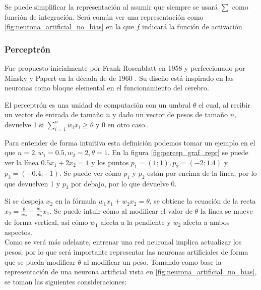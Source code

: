 Se puede simplificar la representación al asumir que siempre se usará $ \sum $ como función de integración. Será común ver una representación como \ref{fig:neurona_artificial_no_bias} en la que $ f $ indicará la función de activación.


\subsubsection{Perceptrón}\label{subsubsec:perceptron}

Fue propuesto inicialmente por Frank Rosenblatt en 1958 y perfeccionado por Minsky y Papert en la década de de 1960 \cite[p.~55-56]{Rojas1996}.
Su diseño está inspirado en las neuronas como bloque elemental en el funcionamiento del cerebro. 

El perceptrón es una unidad de computación con un umbral $ \theta $ el cual, al recibir un vector de entrada de tamaño $ n $ y dado un vector de pesos de tamaño $ n $, devuelve 1 si $ \sum_{i=1}^{n} w_i x_i \geq \theta $ y 0 en otro caso.\cite[p.~60]{Rojas1996}.

Para entender de forma intuitiva esta definición podemos tomar un ejemplo en el que $ n = 2, w_1 = 0.5, w_2 = 2, \theta = 1 $. En la figura \ref{fig:percep_graf_repr} se puede ver la línea $ 0.5x_1 + 2x_2 = 1 $ y los puntos $ p_1=(1;1), p_2=(-2;1.4) $ y $ p_3=(-0.4;-1) $. Se puede ver cómo $ p_1 $ y $ p_2 $ están por encima de la línea, por lo que devuelven 1 y $ p_3 $ por debajo, por lo que devuelve 0.


Si se despeja $x_2$ en la fórmula $ w_1 x_1 + w_2 x_2 = \theta $, se obtiene la ecuación de la recta $ x_2 = \frac{\theta}{w_2} - \frac{w_1}{w_2}x_1 $. Se puede intuir cómo al modificar el valor de $ \theta $ la línea se mueve de forma vertical, así cómo $ w_1 $ afecta a la pendiente y $ w_2 $ afecta a ambos aspectos.\\

Como se verá más adelante, entrenar una red neuronal implica actualizar los pesos, por lo que será importante representar las neuronas artificiales de forma que se pueda modificar $ \theta $ al modificar un peso. Tomando como base la representación de una neurona artificial vista en \ref{fig:neurona_artificial_no_bias}, se toman las siguientes consideraciones:\\

